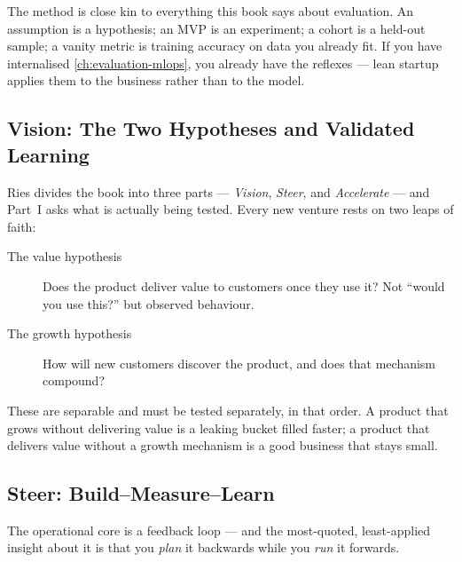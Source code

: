 \begin{engineernote}
The method is close kin to everything this book says about evaluation. An
assumption is a hypothesis; an MVP is an experiment; a cohort is a held-out
sample; a vanity metric is training accuracy on data you already fit. If you
have internalised \cref{ch:evaluation-mlops}, you already have the reflexes ---
lean startup applies them to the business rather than to the model.
\end{engineernote}

\subsection{Vision: The Two Hypotheses and Validated Learning}

Ries divides the book into three parts --- \emph{Vision}, \emph{Steer}, and
\emph{Accelerate} --- and Part~I asks what is actually being tested. Every new
venture rests on two leaps of faith:

\begin{description}
  \item[The value hypothesis] Does the product deliver value to customers once
    they use it? Not ``would you use this?'' but observed behaviour.
  \item[The growth hypothesis] How will new customers discover the product,
    and does that mechanism compound?
\end{description}

These are separable and must be tested separately, in that order. A product
that grows without delivering value is a leaking bucket filled faster; a
product that delivers value without a growth mechanism is a good business that
stays small.

\subsection{Steer: Build--Measure--Learn}

The operational core is a feedback loop --- and the most-quoted, least-applied
insight about it is that you \emph{plan} it backwards while you \emph{run} it
forwards.

